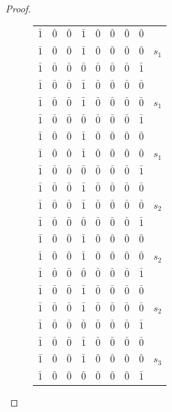 \documentclass[12pt,a4paper]{scrartcl}
\theoremstyle{plain}
\theoremstyle{definition}
\newcommand{\2}{\mathbb{Z} / 2 \mathbb{Z}}
\newcommand{\1}{\bar{1}}
\newcommand{\0}{\bar{0}}
\begin{document}
\begin{proof}
\begin{figure}[]
\begin{minipage}[c]{0.5\textwidth}
\begin{tabular}{|c|c|c|c|c|c|c|c||c|}
			$\1$  & $\0$ \cellcolor[gray]{0.7}& $\0$ & $\1$ & $\0$ & $\0$ & $\0$ & $\0$ &  \\
			$\1$  & $\0$ \cellcolor[gray]{0.7}& $\0$ & $\1$ & $\0$ & $\0$ & $\0$ & $\0$ & $s_1$ \\
			$\1$\cellcolor[gray]{0.7} & $\0$ & $\0$ & $\0$ & $\0$ & $\0$ & $\0$ & $\1$ & \\ \hline
			
			$\1$  & $\0$ & $\0$\cellcolor[gray]{0.7} & $\1$ & $\0$ & $\0$ & $\0$ & $\0$ &  \\
			$\1$  & $\0$ & $\0$\cellcolor[gray]{0.7} & $\1$ & $\0$ & $\0$ & $\0$ & $\0$ & $s_1$ \\
			$\1$\cellcolor[gray]{0.7} & $\0$ & $\0$ & $\0$ & $\0$ & $\0$ & $\0$ & $\1$ & \\ \hline
			
			$\1$  & $\0$ & $\0$ & $\1$\cellcolor[gray]{0.7} & $\0$ & $\0$ & $\0$ & $\0$ &  \\
			$\1$  & $\0$ & $\0$ & $\1$\cellcolor[gray]{0.7} & $\0$ & $\0$ & $\0$ & $\0$ & $s_1$ \\
			$\1$\cellcolor[gray]{0.7} & $\0$ & $\0$ & $\0$ & $\0$ & $\0$ & $\0$ & $\1$ & \\ \hline
			
			$\1$  & $\0$ & $\0$ \cellcolor[gray]{0.7}& $\1$ & $\0$ & $\0$ & $\0$ & $\0$ &  \\
			$\1$  & $\0$ & $\0$ \cellcolor[gray]{0.7}& $\1$ & $\0$ & $\0$ & $\0$ & $\0$ & $s_2$ \\
			$\1$  & $\0$\cellcolor[gray]{0.7} & $\0$ & $\0$ & $\0$ & $\0$ & $\0$ & $\1$ & \\ \hline
			
			$\1$  & $\0$ \cellcolor[gray]{0.7}& $\0$ & $\1$ & $\0$ & $\0$ & $\0$ & $\0$ &  \\
			$\1$  & $\0$ & $\0$ \cellcolor[gray]{0.7}& $\1$ & $\0$ & $\0$ & $\0$ & $\0$ & $s_2$ \\
			$\1$  & $\0$\cellcolor[gray]{0.7} & $\0$ & $\0$ & $\0$ & $\0$ & $\0$ & $\1$ & \\ \hline
			
			$\1$\cellcolor[gray]{0.7} & $\0$ & $\0$ & $\1$ & $\0$ & $\0$ & $\0$ & $\0$ &  \\
			$\1$  & $\0$ & $\0$ \cellcolor[gray]{0.7}& $\1$ & $\0$ & $\0$ & $\0$ & $\0$ & $s_2$ \\
			$\1$  & $\0$\cellcolor[gray]{0.7} & $\0$ & $\0$ & $\0$ & $\0$ & $\0$ & $\1$ & \\ \hline
			
			$\1$  & $\0$ \cellcolor[gray]{0.7}& $\0$ & $\1$ & $\0$ & $\0$ & $\0$ & $\0$ &  \\
			$\1$  & $\0$ & $\0$ \cellcolor[gray]{0.7}& $\1$ & $\0$ & $\0$ & $\0$ & $\0$ & $s_3$ \\
			$\1$  & $\0$\cellcolor[gray]{0.7} & $\0$ & $\0$ & $\0$ & $\0$ & $\0$ & $\1$ & \\ \hline
			

\end{tabular}
\end{minipage}
\end{figure}
\end{proof}
\end{document}
